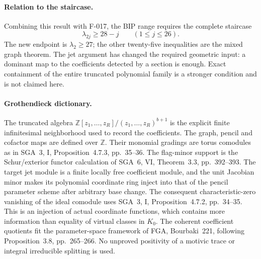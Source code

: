 \paragraph{Relation to the staircase.}
Combining this result with F-017, the BIP range requires the
complete staircase
\[
                    \lambda_{2j}\geq28-j
                              \qquad(1\leq j\leq26).
\]
The new endpoint is \(\lambda_2\geq27\); the other
twenty-five inequalities are the mixed graph theorem.
The jet argument has changed the required geometric input:
a dominant map to the coefficients detected by a section is
enough. Exact containment of the entire truncated polynomial
family is a stronger condition and is not claimed here.

\paragraph{Grothendieck dictionary.}
The truncated algebra
\(\mathbb Z[z_1,\ldots,z_R]/(z_1,\ldots,z_R)^{b+1}\)
is the explicit finite infinitesimal neighborhood used to
record the coefficients. The graph, pencil and cofactor maps
are defined over \(\mathbb Z\). Their monomial gradings
are torus comodules as in SGA~3, I, Proposition~4.7.3,
pp.~35--36. The flag-minor support is the Schur/exterior
functor calculation of SGA~6, VI, Theorem~3.3, pp.~392--393.
The target jet module is a finite locally free coefficient
module, and the unit Jacobian minor makes its polynomial coordinate
ring inject into that of the pencil parameter scheme after arbitrary
base change. The consequent characteristic-zero vanishing of the ideal
comodule uses SGA~3, I, Proposition~4.7.2, pp.~34--35.
This is an injection of actual coordinate functions, which
contains more information than equality of virtual classes
in \(K_0\). The coherent coefficient quotients fit the
parameter-space framework of FGA, Bourbaki~221, following
Proposition~3.8, pp.~265--266. No unproved positivity of a
motivic trace or integral irreducible splitting is used.

